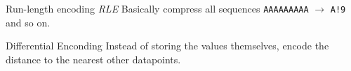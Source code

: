 \documentclass[english]{panikzettel}
\begin{document}
	\begin{defi}{Run-length encoding \textit{RLE}}
		Basically compress all sequences \texttt{AAAAAAAAA} \( \rightarrow \) \texttt{A!9} and so on.
	\end{defi}

	\begin{defi}{Differential Enconding}
		Instead of storing the values themselves, encode the distance to the nearest other datapoints.
	\end{defi}
	


		
	

	
				
\end{document}
